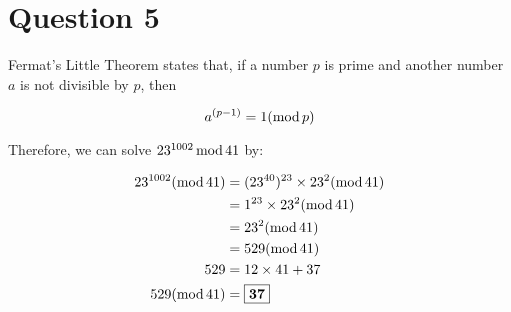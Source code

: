 \documentclass[11pt]{article}
\begin{document}
\section*{Question 5}
Fermat's Little Theorem states that, if a number $p$ is prime and another number $a$ is not divisible by $p$, then

\[a^{(p-1)} = 1 (\mathinner{\text{mod}} p)\]

Therefore, we can solve $23^{1002} \mathinner{\text{mod}} 41$ by:

\begin{align*}
    23^{1002} (\mathinner{\text{mod}} 41) &= (23^{40})^{23} \times 23^2 (\mathinner{\text{mod}} 41)\\
    &= 1^{23} \times 23^2 (\mathinner{\text{mod}} 41)\\
    &= 23^2 (\mathinner{\text{mod}} 41)\\
    &= 529 (\mathinner{\text{mod}} 41)\\
    529 &= 12 \times 41 + 37\\
    529 (\mathinner{\text{mod}} 41) &= \fbox{\textbf{37}}
\end{align*}
\end{document}
